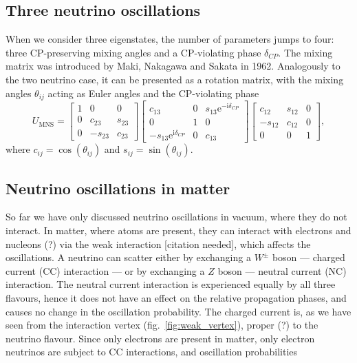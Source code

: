\documentclass[10pt, a4paper]{article}
\newcommand{\me}{\mathrm{e}}
\newcommand{\mi}{\mathrm{i}}
\begin{document}
\subsection{Three neutrino oscillations}
When we consider three eigenstates, the number of parameters jumps to four:
three CP-preserving mixing angles and a CP-violating phase $\delta_{CP}$. The
mixing matrix was introduced by Maki, Nakagawa and Sakata in 1962\cite{MNS}.
Analogously to the two neutrino case, it can be presented as a rotation matrix,
with the mixing angles $\theta_{ij}$ acting as Euler angles and the
CP-violating phase 
$$
U_{\mathrm{MNS}} = 
\begin{bmatrix} 1 & 0 & 0 \\ 0 & c_{23} & s_{23} \\ 0 & -s_{23} & c_{23} \end{bmatrix}
\begin{bmatrix} c_{13} & 0 & s_{13} \me^{-\mi \delta_{CP}} \\ 0 & 1 & 0 \\
								-s_{13} \me^{\mi \delta_{CP}} & 0 & c_{13} \end{bmatrix} 
\begin{bmatrix} c_{12} & s_{12} & 0 \\ -s_{12} & c_{12} & 0 \\ 0 & 0 & 1 \end{bmatrix}
,$$
where $c_{ij} = \cos(\theta_{ij})$ and $s_{ij} = \sin(\theta_{ij})$.

\subsection{Neutrino oscillations in matter}
So far we have only discussed neutrino oscillations in vacuum, where they do
not interact. In matter, where atoms are present, they can interact with
electrons and nucleons (?) via the weak interaction [citation needed], which affects the
oscillations. A neutrino can scatter either by exchanging a $W^\pm$ boson ---
charged current (CC) interaction --- or by exchanging a $Z$ boson --- neutral
current (NC) interaction. The neutral current interaction is experienced
equally by all three flavours, hence it does not have an effect on the relative
propagation phases, and causes no change in the oscillation probability. The
charged current is, as we have seen from the interaction vertex
(fig.~\ref{fig:weak_vertex}), proper (?) to the neutrino flavour. Since only
electrons are present in matter, only electron neutrinos are subject to CC
interactions, and oscillation probabilities
\end{document}
